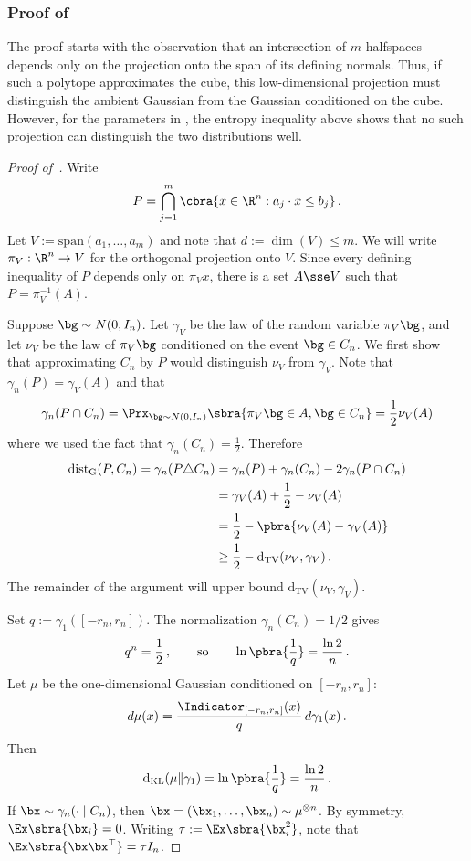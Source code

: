 \documentclass[11pt]{article}
\newcommand{\dG}{\mathrm{dist}_{\mathrm{G}}}
\newcommand{\dtv}{\mathrm{d}_{\mathrm{TV}}}
\newcommand{\dkl}{\mathrm{d}_{\mathrm{KL}}}
\begin{document}
\subsubsection{Proof of~}

The proof starts with the observation that an intersection of $m$ halfspaces depends only on the projection onto the span of its defining normals. 
Thus, if such a polytope approximates the cube, this low-dimensional projection must distinguish the ambient Gaussian from the Gaussian conditioned on the cube. 
However, for the parameters in , the entropy inequality above shows that no such projection can distinguish the two distributions well.

\begin{proof}[Proof of~]
	Write
	\[
		P=\bigcap_{j=1}^m\cbra{x\in\R^n:a_j\cdot x\leq b_j}\,.
	\]
	Let $V:=\mathrm{span}(a_1,\ldots,a_m)$ and note that $d:=\dim (V)\leq m$. 
	We will write $\pi_V: \R^n \to V$ for the orthogonal projection onto $V$. 
	Since every defining inequality of $P$ depends only on $\pi_V x$, there is a set $A\sse V$ such that $P=\pi_V^{-1}(A)$. 

	Suppose $\bg\sim N(0,I_n)$. 
	Let $\gamma_V$ be the law of the random variable $\pi_V\bg$, and let $\nu_V$ be the law of $\pi_V \bg$ conditioned on the event $\bg \in C_n$. 
	We first show that approximating $C_n$ by $P$ would distinguish $\nu_V$ from $\gamma_V$. 
	Note that $\gamma_n(P) = \gamma_V(A)$ and that 
	\[
		\gamma_n(P\cap C_n) = \Prx_{\bg\sim N(0,I_n)}\sbra{\pi_V\bg\in A, \bg\in C_n} = \frac{1}{2}\nu_V(A)
	\]
	where we used the fact that $\gamma_n(C_n) = \frac{1}{2}$. 
	Therefore
	\begin{align}
		\dG(P, C_n) 
		= \gamma_n(P\triangle C_n)
		&=
		\gamma_n(P)+\gamma_n(C_n)-2\gamma_n(P\cap C_n) \nonumber \\
		&=
		\gamma_V(A)+\frac{1}{2}-\nu_V(A) \nonumber \\
		&=
		\frac{1}{2}-\pbra{\nu_V(A)-\gamma_V(A)} \nonumber \\
		&\geq
		\frac{1}{2}-\dtv(\nu_V,\gamma_V)\,. \label{eq:potato}
	\end{align}
	The remainder of the argument will upper bound $\dtv(\nu_V,\gamma_V)$. 

	Set $q:=\gamma_1([-r_n,r_n])$. 
	The normalization $\gamma_n(C_n)=1/2$ gives
	\[
		q^n=\frac{1}{2}\,,
		\qquad\text{so}\qquad
		\ln\pbra{\frac{1}{q}} = \frac{\ln 2}{n}\,.
	\]
	Let $\mu$ be the one-dimensional Gaussian conditioned on $[-r_n,r_n]$:
	\[
		d\mu(x)=\frac{\Indicator_{[-r_n,r_n]}(x)}{q}\,d\gamma_1(x)\,.
	\]
	Then
	\[
		\dkl(\mu\|\gamma_1)=\ln\pbra{\frac{1}{q}} =\frac{\ln 2}{n}\,.
	\]
	If $\bx\sim\gamma_n(\cdot\mid C_n)$, then $\bx=(\bx_1,\ldots,\bx_n)\sim\mu^{\otimes n}$.
	By symmetry, $\Ex\sbra{\bx_i}=0$.  
	Writing $\tau:=\Ex\sbra{\bx_i^2}$, note that  $\Ex\sbra{\bx\bx^\top}=\tau I_n$. 


\end{proof}
\end{document}
